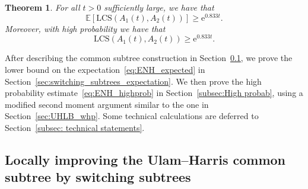 \documentclass[11pt]{article}
\numberwithin{equation}{section}
\newcommand{\E}{\mathbb{E}} %
\newcommand{\MCST}{\mathrm{LCS}} %
\newcommand{\be}{\begin{equation}}
\newcommand{\ee}{\end{equation}}
\newcommand{\e}{\mathrm e}
\newtheorem{theorem}{Theorem}[section]
\theoremstyle{definition}
\begin{document}
\begin{theorem}\label{thm:ENH_matching_cts}
For all $t>0$ sufficiently large, we have that
\be\label{eq:ENH_expected}
    \E \left[ \MCST\left( A_1(t ), A_2(t) \right)\right] \geq \e^{0.833 t}.
\ee
Moreover, with high probability we have that
\be \label{eq:ENH_highprob}
     \MCST\left( A_1(t ), A_2(t) \right) \geq \e^{0.833 t}.
\ee
\end{theorem}
After describing the common subtree construction in Section~\ref{sec:switching_subtrees}, 
we prove the lower bound on the expectation~\eqref{eq:ENH_expected} in Section~\ref{sec:switching_subtrees_expectation}. 
We then prove the high probability estimate~\eqref{eq:ENH_highprob} in Section~\ref{subsec:High probab}, using a modified second moment argument similar to the one in Section~\ref{sec:UHLB_whp}. 
Some technical calculations are deferred to Section~\ref{subsec: technical statements}. 

\subsection{Locally improving the Ulam--Harris common subtree by switching subtrees}\label{sec:switching_subtrees}
\end{document}
